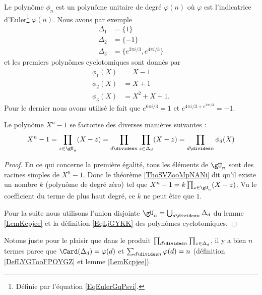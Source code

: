 Le polynôme \( \phi_n\) est un polynôme unitaire de degré \( \varphi(n)\) où \( \varphi\) est l'indicatrice d'Euler\footnote{Définie par l'équation \ref{EqEulerGqPsvi}.} \( \varphi(n)\). Nous avons par exemple
\begin{subequations}
    \begin{align}
        \Delta_1&=\{ 1 \}\\
        \Delta_2&=\{ -1 \}\\
        \Delta_3&=\{  e^{2\pi i/3}, e^{4\pi i/3} \}
    \end{align}
\end{subequations}
et les premiers polynômes cyclotomiques sont donnés par
\begin{subequations}
    \begin{align}
        \phi_1(X)&=X-1\\
        \phi_2(X)&=X+1\\
        \phi_3(X)&=X^2+X+1.
    \end{align}
\end{subequations}
Pour le dernier nous avons utilisé le fait que \(  e^{6\pi i/3}=1\) et \(  e^{4\pi i/3+ e^{2\pi i/3}}=-1\).

\begin{lemma}   \label{LemKYGBooAwpOHD}
    Le polynôme \( X^n-1\) se factorise des diverses manières suivantes :
    \begin{equation}
        X^n-1=\prod_{z\in \gU_n}(X-z)=\prod_{d\divides n}\prod_{z\in \Delta_d}(X-z)=\prod_{d\divides n}\phi_d(X)
    \end{equation}
\end{lemma}

\begin{proof}
    En ce qui concerne la première égalité, tous les éléments de \( \gU_n\) sont des racines simples de \( X^n-1\). Donc le théorème \ref{ThoSVZooMpNANi} dit qu'il existe un nombre \( k\) (polynôme de degré zéro) tel que \( X^n-1=k\prod_{z\in \gU_n}(X-z)\). Vu le coefficient du terme de plus haut degré, ce \( k\) ne peut être que \( 1\).

    Pour la suite nous utilisons l'union disjointe \( \gU_n=\bigcup_{d\divides n}\Delta_d\) du lemme \ref{LemKcpjee} et la définition \eqref{EqLjGYKK} des polynômes cyclotomiques.
\end{proof}

\begin{remark}
    Notons juste pour le plaisir que dans le produit \( \prod_{d\divides n}\prod_{z\in\Delta_d}\), il y a bien \( n\) termes parce que \( \Card(\Delta_d)=\varphi(d)\) et \( \sum_{d\divides n}\varphi(d)=n\) (définition \ref{DefLYGTooFPOYGZ} et lemme \ref{LemKcpjee}).
\end{remark}

